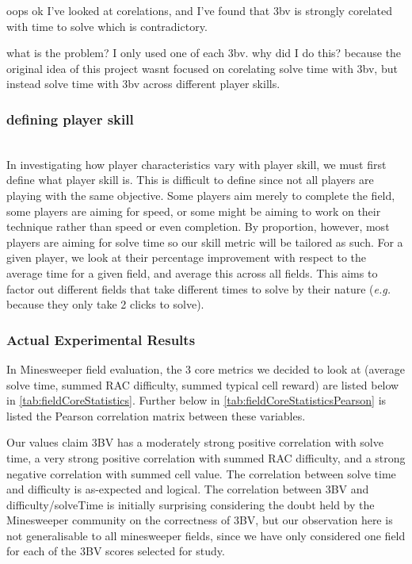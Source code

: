         oops ok I've looked at corelations, and I've found that 3bv is strongly corelated with time to solve
        which is contradictory.
        
        what is the problem? I only used one of each 3bv.
        why did I do this? because the original idea of this project wasnt focused on corelating solve time with 3bv, but instead solve time with 3bv across different player skills.
    
    \subsubsection{\textbf{defining player skill}} \label{definePlayerSkill} \hfill \\
        In investigating how player characteristics vary with player skill, we must first define what player skill is.
        This is difficult to define since not all players are playing with the same objective. Some players aim merely to complete the field, some players are aiming for speed, or some might be aiming to work on their technique rather than speed or even completion.
        By proportion, however, most players are aiming for solve time so our skill metric will be tailored as such.
        For a given player, we look at their percentage improvement with respect to the average time for a given field, and average this across all fields. This aims to factor out different fields that take different times to solve by their nature (\textit{e.g.} because they only take 2 clicks to solve).
    
    \subsubsection{Actual Experimental Results}
        In Minesweeper field evaluation, the 3 core metrics we decided to look at (average solve time, summed RAC difficulty, summed typical cell reward) are listed below in \ref{tab:fieldCoreStatistics}.
        Further below in \ref{tab:fieldCoreStatisticsPearson} is listed the Pearson correlation matrix between these variables.
        
        Our values claim 3BV has a moderately strong positive correlation with solve time, a very strong positive correlation with summed RAC difficulty, and a strong negative correlation with summed cell value.
        The correlation between solve time and difficulty is as-expected and logical. The correlation between 3BV and difficulty/solveTime is initially surprising considering the doubt held by the Minesweeper community  on the correctness of 3BV, but our observation here is not generalisable to all minesweeper fields, since we have only considered one field for each of the 3BV scores selected for study.
        
